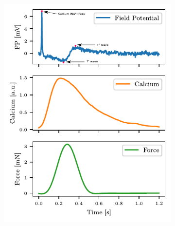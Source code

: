 \documentclass{report}
\begin{document}
            \begin{figure}[H]
                \centering
                \begin{subfigure}[b]{0.4\textwidth}
                    \includegraphics[width=\textwidth]{plots/chapter_3/single_contraction_plot_annotatedpdf.pdf}
                    \caption[Non-arrhythmic contraction]{}
                    \label{fig:single-contraction}
                \end{subfigure}
                ~~~
                \begin{subfigure}[b]{0.4\textwidth}

\end{subfigure}
\end{figure}
\end{document}
